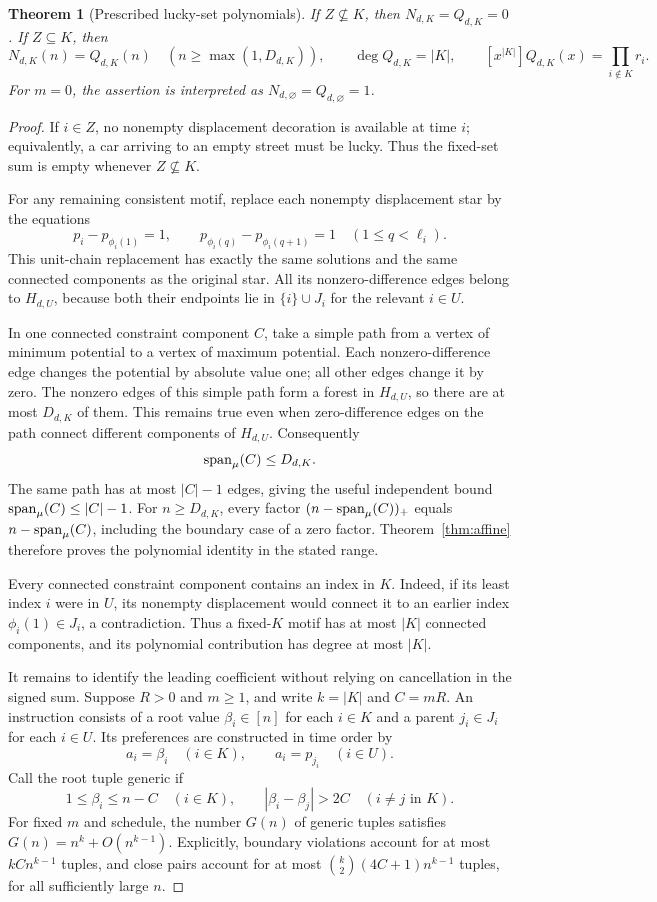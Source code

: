 \documentclass[11pt,a4paper]{article}
\newtheorem{theorem}{Theorem}[section]\newtheorem{lemma}[theorem]{Lemma}\newtheorem{corollary}[theorem]{Corollary}\newtheorem{proposition}[theorem]{Proposition}\theoremstyle{remark}\newtheorem{remark}[theorem]{Remark}\newtheorem{example}[theorem]{Example}
\begin{document}
\begin{theorem}[Prescribed lucky-set polynomials]\label{thm:fixed}
If $Z\not\subseteq K$, then $N_{d,K}=Q_{d,K}=0$.
If $Z\subseteq K$, then
\[
 N_{d,K}(n)=Q_{d,K}(n)\quad(n\ge\max(1,D_{d,K})),
 \qquad
 \deg Q_{d,K}=|K|,
 \qquad
 [x^{|K|}]Q_{d,K}(x)=\prod_{i\notin K}r_i.
\]
For $m=0$, the assertion is interpreted as $N_{d,\varnothing}=Q_{d,\varnothing}=1$.
\end{theorem}
\begin{proof}
If $i\in Z$, no nonempty displacement decoration is available at time $i$;
equivalently, a car arriving to an empty street must be lucky.  Thus the
fixed-set sum is empty whenever $Z\not\subseteq K$.

For any remaining consistent motif, replace each nonempty displacement star
by the equations
\[
 p_i-p_{\phi_i(1)}=1,\qquad
 p_{\phi_i(q)}-p_{\phi_i(q+1)}=1\quad(1\le q<\ell_i).
\]
This unit-chain replacement has exactly the same solutions and the same
connected components as the original star.  All its nonzero-difference edges
belong to $H_{d,U}$, because both their endpoints lie in
$\{i\}\cup J_i$ for the relevant $i\in U$.

In one connected constraint component $C$, take a simple path from a
vertex of minimum potential to a vertex of maximum potential.  Each
nonzero-difference edge changes the potential by absolute value one;
all other edges change it by zero.  The nonzero edges of this simple path
form a forest in $H_{d,U}$, so there are at most $D_{d,K}$ of them.
This remains true even when zero-difference edges on the path connect
different components of $H_{d,U}$.  Consequently
\[
 \operatorname{span}_\mu(C)\le D_{d,K}.
\]
The same path has at most $|C|-1$ edges, giving the useful independent
bound $\operatorname{span}_\mu(C)\le|C|-1$.
For $n\ge D_{d,K}$, every factor $(n-\operatorname{span}_\mu(C))_+$ equals
$n-\operatorname{span}_\mu(C)$, including the boundary case of a zero factor.
Theorem~\ref{thm:affine} therefore proves the polynomial identity in the
stated range.

Every connected constraint component contains an index in $K$.
Indeed, if its least index $i$ were in $U$, its nonempty displacement
would connect it to an earlier index $\phi_i(1)\in J_i$, a contradiction.
Thus a fixed-$K$ motif has at most $|K|$ connected components, and its
polynomial contribution has degree at most $|K|$.

It remains to identify the leading coefficient without relying on
cancellation in the signed sum.  Suppose $R>0$ and $m\ge1$, and write
$k=|K|$ and $C=mR$.  An instruction consists of a root value
$\beta_i\in[n]$ for each $i\in K$ and a parent
$j_i\in J_i$ for each $i\in U$.  Its preferences are constructed in time
order by
\[
 a_i=\beta_i\quad(i\in K),\qquad a_i=p_{j_i}\quad(i\in U).
\]
Call the root tuple generic if
\[
 1\le\beta_i\le n-C\quad(i\in K),\qquad
 |\beta_i-\beta_j|>2C\quad(i\ne j\text{ in }K).
\]
For fixed $m$ and schedule, the number $G(n)$ of generic tuples satisfies
$G(n)=n^k+O(n^{k-1})$.  Explicitly, boundary violations account for at
most $kC n^{k-1}$ tuples, and close pairs account for at most
$\binom{k}{2}(4C+1)n^{k-1}$ tuples, for all sufficiently large $n$.


\end{proof}
\end{document}
